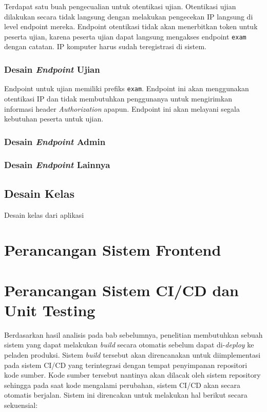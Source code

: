     Terdapat satu buah pengecualian untuk otentikasi ujian. Otentikasi ujian dilakukan secara tidak
    langsung dengan melakukan pengecekan IP langsung di level endpoint mereka. Endpoint otentikasi
    tidak akan menerbitkan token untuk peserta ujian, karena peserta ujian dapat langsung
    mengakses endpoint \texttt{exam} dengan catatan. IP komputer harus sudah teregistrasi di
    sistem.
    
\subsubsection{Desain \textit{Endpoint} Ujian}
    Endpoint untuk ujian memiliki prefiks \texttt{exam}. Endpoint ini akan menggunakan otentikasi
    IP dan tidak membutuhkan penggunanya untuk mengirimkan informasi header \textit{Authorization}
    apapun. Endpoint ini akan melayani segala kebutuhan peserta untuk ujian.
    
\subsubsection{Desain \textit{Endpoint} Admin}
    
\subsubsection{Desain \textit{Endpoint} Lainnya}
    
\subsection{Desain Kelas}
    Desain kelas dari aplikasi
    
\section{Perancangan Sistem Frontend}
    
    
\section{Perancangan Sistem CI/CD dan Unit Testing}
    Berdasarkan hasil analisis pada bab sebelumnya, penelitian membutuhkan sebuah sistem yang dapat
    melakukan \textit{build} secara otomatis sebelum dapat di-\textit{deploy} ke peladen produksi.
    Sistem \textit{build} tersebut akan direncanakan untuk diimplementasi pada sistem CI/CD yang
    terintegrasi dengan tempat penyimpanan repositori kode sumber. Kode sumber tersebut nantinya akan
    dilacak oleh sistem repository sehingga pada saat kode mengalami perubahan, sistem CI/CD akan
    secara otomatis berjalan. Sistem ini direncakan untuk melakukan hal berikut secara sekuensial:
    
